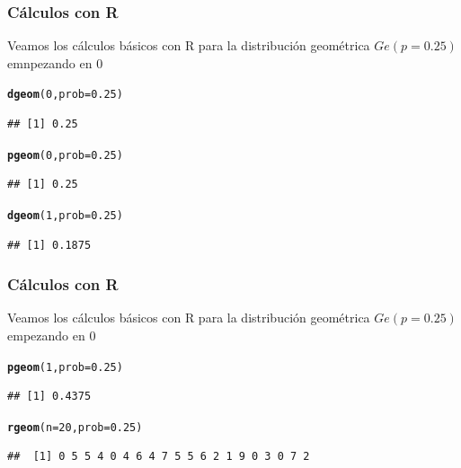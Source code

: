 \documentclass[handout]{beamer}\usepackage[]{graphicx}\usepackage[]{color}
\makeatletter
\newcommand{\hlnum}[1]{\textcolor[rgb]{0.686,0.059,0.569}{#1}}%
\newcommand{\hlstd}[1]{\textcolor[rgb]{0.345,0.345,0.345}{#1}}%
\newcommand{\hlkwc}[1]{\textcolor[rgb]{0.333,0.667,0.333}{#1}}%
\newcommand{\hlkwd}[1]{\textcolor[rgb]{0.737,0.353,0.396}{\textbf{#1}}}%
\newenvironment{kframe}{%
 \def\at@end@of@kframe{}%
 \ifinner\ifhmode%
  \def\at@end@of@kframe{\end{minipage}}%
  \begin{minipage}{\columnwidth}%
 \fi\fi%
 \def\FrameCommand##1{\hskip\@totalleftmargin \hskip-\fboxsep
 \colorbox{shadecolor}{##1}\hskip-\fboxsep
     \hskip-\linewidth \hskip-\@totalleftmargin \hskip\columnwidth}%
 \MakeFramed {\advance\hsize-\width
   \@totalleftmargin\z@ \linewidth\hsize
   \@setminipage}}%
 {\par\unskip\endMakeFramed%
 \at@end@of@kframe}
\newenvironment{knitrout}{}{} %
\theoremstyle{plain}
\theoremstyle{definition}
\makeatother
\begin{document}
\begin{frame}[fragile]
\frametitle{Cálculos con R}
Veamos los cálculos básicos con  R para la distribución geométrica  $Ge(p=0.25)$ emnpezando en $0$

\begin{knitrout}
\color{fgcolor}\begin{kframe}
\begin{alltt}
\hlkwd{dgeom}\hlstd{(}\hlnum{0}\hlstd{,}\hlkwc{prob}\hlstd{=}\hlnum{0.25}\hlstd{)}
\end{alltt}
\begin{verbatim}
## [1] 0.25
\end{verbatim}
\begin{alltt}
\hlkwd{pgeom}\hlstd{(}\hlnum{0}\hlstd{,}\hlkwc{prob}\hlstd{=}\hlnum{0.25}\hlstd{)}
\end{alltt}
\begin{verbatim}
## [1] 0.25
\end{verbatim}
\begin{alltt}
\hlkwd{dgeom}\hlstd{(}\hlnum{1}\hlstd{,}\hlkwc{prob}\hlstd{=}\hlnum{0.25}\hlstd{)}
\end{alltt}
\begin{verbatim}
## [1] 0.1875
\end{verbatim}
\end{kframe}
\end{knitrout}

\end{frame}

\begin{frame}[fragile]
\frametitle{Cálculos con R}
Veamos los cálculos básicos con  R para la distribución geométrica  $Ge(p=0.25)$ empezando en $0$

\begin{knitrout}
\color{fgcolor}\begin{kframe}
\begin{alltt}
\hlkwd{pgeom}\hlstd{(}\hlnum{1}\hlstd{,}\hlkwc{prob}\hlstd{=}\hlnum{0.25}\hlstd{)}
\end{alltt}
\begin{verbatim}
## [1] 0.4375
\end{verbatim}
\begin{alltt}
\hlkwd{rgeom}\hlstd{(}\hlkwc{n}\hlstd{=}\hlnum{20}\hlstd{,}\hlkwc{prob}\hlstd{=}\hlnum{0.25}\hlstd{)}
\end{alltt}
\begin{verbatim}
##  [1] 0 5 5 4 0 4 6 4 7 5 5 6 2 1 9 0 3 0 7 2
\end{verbatim}
\end{kframe}
\end{knitrout}

\end{frame}
\end{document}
